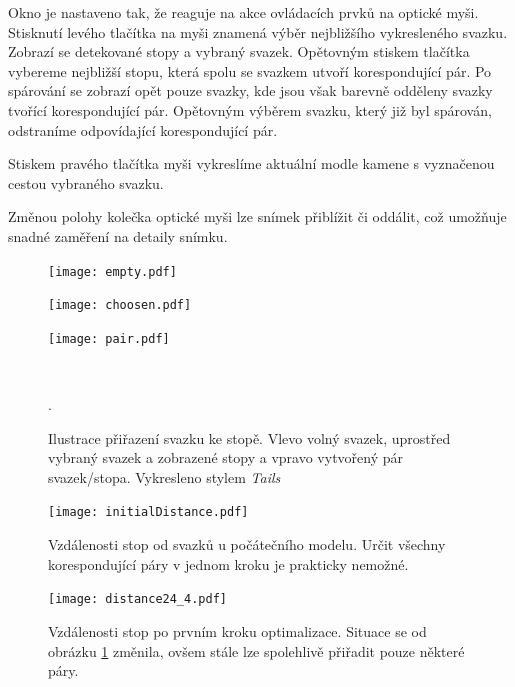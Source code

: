 Okno je nastaveno tak, že reaguje na akce ovládacích prvků na optické myši. Stisknutí levého tlačítka na myši znamená výběr nejbližšího vykresleného svazku. Zobrazí se detekované stopy a vybraný svazek. Opětovným stiskem tlačítka vybereme nejbližší stopu, která spolu se svazkem utvoří korespondující pár. Po spárování se zobrazí opět pouze svazky, kde jsou však barevně odděleny svazky tvořící korespondující pár. Opětovným výběrem svazku, který již byl spárován, odstraníme odpovídající korespondující pár. 

Stiskem pravého tlačítka myši vykreslíme aktuální modle kamene s vyznačenou cestou vybraného svazku.

Změnou polohy kolečka optické myši lze snímek přiblížit či oddálit, což umožňuje snadné zaměření na detaily snímku. 

\begin{figure}[h!]
   \centering
   \begin{minipage}[c]{0.3\textwidth}
     \centering \texttt{[image: empty.pdf]} 
   \end{minipage}
   \begin{minipage}[c]{0.3\textwidth}
     \centering \texttt{[image: choosen.pdf]} 
   \end{minipage}
   \begin{minipage}[c]{0.3\textwidth}
     \centering \texttt{[image: pair.pdf]}
   \end{minipage}
   \\
   \caption{Ilustrace přiřazení svazku ke stopě. Vlevo volný svazek, uprostřed vybraný svazek a zobrazené stopy a vpravo vytvořený pár svazek/stopa. Vykresleno stylem \textit{Tails}}.
   
\end{figure}

\begin{figure}[h!]
     \centering \texttt{[image: initialDistance.pdf]} 
   \caption{Vzdálenosti stop od svazků u počátečního modelu. Určit všechny korespondující páry v jednom kroku je prakticky nemožné.}
   \label{fig:initDistance}
   
\end{figure}


\begin{figure}[h!]
     \centering \texttt{[image: distance24\_4.pdf]} 
   \caption{Vzdálenosti stop po prvním kroku optimalizace. Situace se od obrázku \ref{fig:initDistance} změnila, ovšem stále lze spolehlivě přiřadit pouze některé páry.}
   
\end{figure}



  
